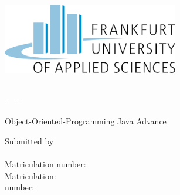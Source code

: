 \thispagestyle{empty}
\begin{titlepage}

  \condTWOSIDE{\changetext{}{19mm}{}{19mm}{}}

  \vspace{1cm}
  \begin{center}
    \includegraphics[width=7.7cm]{gfx/fh_logo} \\
  \end{center}

  \begin{center}
    \vspace{0.1cm}
    \huge \textbf{\myUni}\\
    \vspace{0.4cm}
    \LARGE --~\myFaculty{}~--
  \end{center}

  \vfill
  \vfill

  \begin{center}
    \LARGE \textbf{\myTitle}
  \end{center} 

  \vfill
  \vfill

  \begin{center}
    \Large Object-Oriented-Programming Java Advance\\
    \vspace{0.3cm}
    \Large \myDegree{}
  \end{center}

  \vfill

  \begin{center}
    \Large Submitted by\\
    \vspace{0.3cm}
    \Large \textbf{\myNameK}\\
    \vspace{0.3cm}
    \normalsize Matriculation number: \myIdK{}
    \vfill
    \vspace{0.3cm}
    \Large \textbf{\myNameM}\\
    \vspace{0.3cm}
    \normalsize Matriculation: \myIdM{}
    \vfill
    \vspace{0.3cm}
    \Large \textbf{\myNameH}\\
    \vspace{0.3cm}
    \normalsize  number: \myIdH{}
    \vfill


\end{center}
\end{titlepage}

